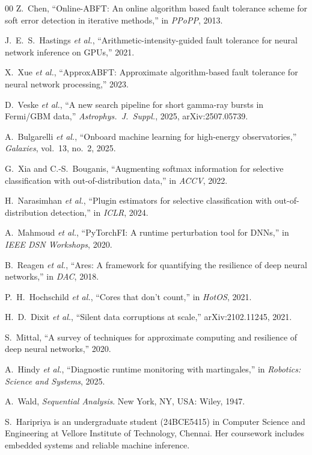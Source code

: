 \documentclass[journal]{IEEEtran}
\begin{document}
\begin{thebibliography}{00}
Z.~Chen, ``Online-ABFT: An online algorithm based fault tolerance scheme for soft error detection in iterative methods,'' in \textit{PPoPP}, 2013.

J.~E.~S.~Hastings \textit{et al.}, ``Arithmetic-intensity-guided fault tolerance for neural network inference on GPUs,'' 2021.

X.~Xue \textit{et al.}, ``ApproxABFT: Approximate algorithm-based fault tolerance for neural network processing,'' 2023.

D.~Veske \textit{et al.}, ``A new search pipeline for short gamma-ray bursts in Fermi/GBM data,'' \textit{Astrophys.\ J.\ Suppl.}, 2025, arXiv:2507.05739.

A.~Bulgarelli \textit{et al.}, ``Onboard machine learning for high-energy observatories,'' \textit{Galaxies}, vol.~13, no.~2, 2025.

G.~Xia and C.-S.~Bouganis, ``Augmenting softmax information for selective classification with out-of-distribution data,'' in \textit{ACCV}, 2022.

H.~Narasimhan \textit{et al.}, ``Plugin estimators for selective classification with out-of-distribution detection,'' in \textit{ICLR}, 2024.

A.~Mahmoud \textit{et al.}, ``PyTorchFI: A runtime perturbation tool for DNNs,'' in \textit{IEEE DSN Workshops}, 2020.

B.~Reagen \textit{et al.}, ``Ares: A framework for quantifying the resilience of deep neural networks,'' in \textit{DAC}, 2018.

P.~H.~Hochschild \textit{et al.}, ``Cores that don't count,'' in \textit{HotOS}, 2021.

H.~D.~Dixit \textit{et al.}, ``Silent data corruptions at scale,'' arXiv:2102.11245, 2021.

S.~Mittal, ``A survey of techniques for approximate computing and resilience of deep neural networks,'' 2020.

A.~Hindy \textit{et al.}, ``Diagnostic runtime monitoring with martingales,'' in \textit{Robotics: Science and Systems}, 2025.

A.~Wald, \textit{Sequential Analysis}. New York, NY, USA: Wiley, 1947.

\end{thebibliography}

\begin{IEEEbiographynophoto}{S.~Haripriya}
is an undergraduate student (24BCE5415) in Computer Science and Engineering at Vellore Institute of Technology, Chennai. Her coursework includes embedded systems and reliable machine inference.
\end{IEEEbiographynophoto}
\end{document}
